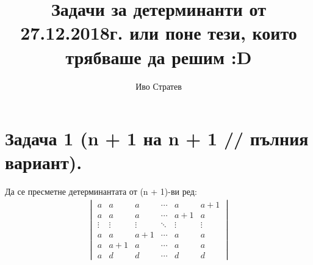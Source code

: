 \documentclass[a4paper, 12pt, oneside]{article}
\title{Задачи за детерминанти от 27.12.2018г. или поне тези, които трябваше да решим :D}
\author{Иво Стратев}
\begin{document}
\maketitle
\section*{Задача 1 (n + 1 на n + 1 // пълния вариант).}
Да се пресметне детерминантата от (n + 1)-ви ред:
\begin{align*}
\begin{vmatrix}
    a & a & a & \cdots & a & a + 1 \\
    a & a & a & \cdots & a + 1 & a \\
    \vdots & \vdots & \vdots & \ddots & \vdots & \vdots \\
    a & a & a + 1 & \cdots & a & a \\
    a & a + 1 & a & \cdots & a & a \\
    a & d & d & \cdots & d & d
\end{vmatrix}
\end{align*}
\end{document}
